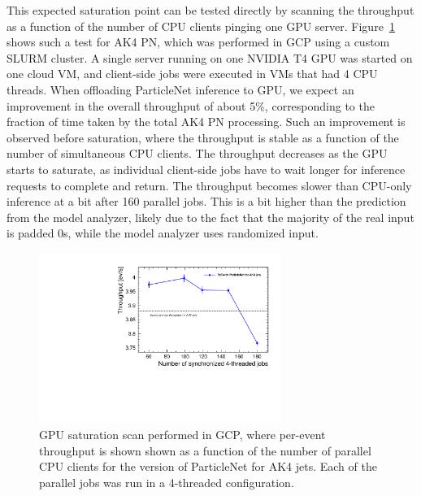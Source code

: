 This expected saturation point can be tested directly by scanning the throughput as a function of the number of CPU clients pinging one GPU server. Figure~\ref{fig:throughputs_scan_pn} shows such a test for AK4 PN, which was performed in GCP using a custom SLURM cluster. A single server running on one NVIDIA T4 GPU was started on one cloud VM, and client-side jobs were executed in VMs that had 4 CPU threads.
When offloading ParticleNet inference to GPU, we expect an improvement in the overall throughput of about 5\%, corresponding to the fraction of time taken by the total AK4 PN processing. Such an improvement is observed before saturation, where the throughput is stable as a function of the number of simultaneous CPU clients. The throughput decreases as the GPU starts to saturate, as individual client-side jobs have to wait longer for inference requests to complete and return. The throughput becomes slower than CPU-only inference at a bit after 160 parallel jobs.  This is a bit higher than the prediction from the model analyzer, likely due to the fact that the majority of the real input is padded 0s, while the model analyzer uses randomized input.
\begin{figure}[ht]
    \centering
    \includegraphics[width=0.70\textwidth]{plots/PN_throughput_scan_PT.pdf}
    \caption{GPU saturation scan performed in GCP, where per-event throughput is shown shown as a function of the number of parallel CPU clients for the \PYTORCH version of ParticleNet for AK4 jets. Each of the parallel jobs was run in a 4-threaded configuration.}
    \label{fig:throughputs_scan_pn}
\end{figure}


